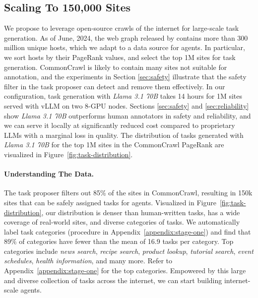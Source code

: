 \subsection{Scaling To 150,000 Sites}
\label{sec:scaling-task-generation}

We propose to leverage open-source crawls of the internet for large-scale task generation. As of June, 2024, the web graph released by \citet{CommonCrawl} contains more than 300 million unique hosts, which we adapt to a data source for agents. In particular, we sort hosts by their PageRank values, and select the top 1M sites for task generation. CommonCrawl is likely to contain many sites not suitable for annotation, and the experiments in Section \ref{sec:safety} illustrate that the safety filter in the task proposer can detect and remove them effectively. In our configuration, task generation with \textit{Llama 3.1 70B} takes 14 hours for 1M sites served with vLLM \citep{vLLM} on two 8-GPU nodes. Sections \ref{sec:safety} and \ref{sec:reliability} show \textit{Llama 3.1 70B} outperforms human annotators in safety and reliability, and we can serve it locally at significantly reduced cost compared to proprietary LLMs with a marginal loss in quality. The distribution of tasks generated with \textit{Llama 3.1 70B} for the top 1M sites in the CommonCrawl PageRank are visualized in Figure~\ref{fig:task-distribution}.

\paragraph{Understanding The Data.} The task proposer filters out 85\% of the sites in CommonCrawl, resulting in 150k sites that can be safely assigned tasks for agents. Visualized in Figure~\ref{fig:task-distribution}, our distribution is denser than human-written tasks, has a wide coverage of real-world sites, and diverse categories of tasks. We automatically label task categories (procedure in Appendix~\ref{appendix:stage-one}) and find that 89\% of categories have fewer than the mean of 16.9 tasks per category. Top categories include \textit{news search}, \textit{recipe search}, \textit{product lookup}, \textit{tutorial search}, \textit{event schedules}, \textit{health information}, and many more. Refer to Appendix~\ref{appendix:stage-one} for the top categories. Empowered by this large and diverse collection of tasks across the internet, we can start building internet-scale agents.

